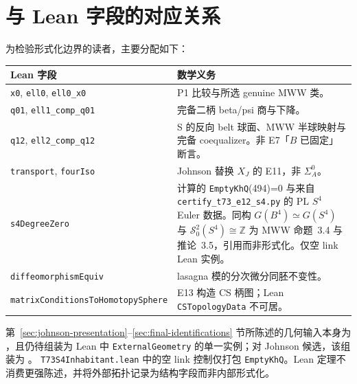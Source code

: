 \section{与 Lean 字段的对应关系}\label{app:lean-fields}

为检验形式化边界的读者，主要分配如下：
\begin{center}
\small
\begin{tabularx}{\textwidth}{@{}l X@{}}
\toprule
Lean 字段 & 数学义务 \\
\midrule
\texttt{x0}, \texttt{ell0}, \texttt{ell0\_x0} & P1 比较与所选 genuine MWW 类。 \\
\texttt{q01}, \texttt{ell1\_comp\_q01} & 完备二柄 beta/psi 商与下降。 \\
\texttt{q12}, \texttt{ell2\_comp\_q12} & S 的反向 belt 球面、MWW 半球映射与完备 coequalizer。非 E7「$B$ 已固定」断言。 \\
\texttt{transport}, \texttt{fourIso} & Johnson 替换 $X_J$ 的 E11，非 $\Sigma_A^0$。 \\
\texttt{s4DegreeZero} & 计算的 \texttt{EmptyKhQ}(494)=0 与来自 \texttt{certify\_t73\_e12\_s4.py} 的 PL $S^4$ Euler 数据。同构 $G(B^4)\simeq G(S^4)$ 与 $\mathcal S^2_0(S^4)\cong\mathbb Z$ 为 MWW 命题~3.4 与推论~3.5，引用而非形式化。仅空 link Lean 实例。 \\
\texttt{diffeomorphismEquiv} & lasagna 模的分次微分同胚不变性。 \\
\texttt{matrixConditionsToHomotopySphere} & E13 构造 CS 柄图；Lean \texttt{CSTopologyData} 不可居。 \\
\bottomrule
\end{tabularx}
\end{center}

第~\ref{sec:johnson-presentation}--\ref{sec:final-identifications} 节所陈述的几何输入本身为 \Open，且仍待组装为 Lean 中 \texttt{ExternalGeometry} 的单一实例；对 Johnson 候选，该组装为 \Open。
\texttt{T73S4Inhabitant.lean} 中的空 link 控制仅打包 \texttt{EmptyKhQ}。Lean 定理不消费更强陈述，并将外部拓扑记录为结构字段而非内部形式化。



